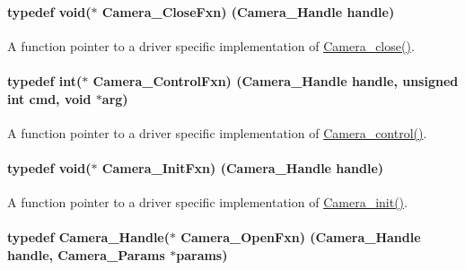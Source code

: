 \paragraph[{Camera\+\_\+\+Close\+Fxn}]{\setlength{\rightskip}{0pt plus 5cm}typedef void($\ast$ Camera\+\_\+\+Close\+Fxn) ({\bf Camera\+\_\+\+Handle} handle)}\label{_camera_8h_ae6f2789af3ea253197fd2ce98db352f4}


A function pointer to a driver specific implementation of \hyperlink{_camera_8h_a132c638e5ea994c1f06124f5762470b4}{Camera\+\_\+close()}. 

\paragraph[{Camera\+\_\+\+Control\+Fxn}]{\setlength{\rightskip}{0pt plus 5cm}typedef int($\ast$ Camera\+\_\+\+Control\+Fxn) ({\bf Camera\+\_\+\+Handle} handle, unsigned int cmd, void $\ast$arg)}\label{_camera_8h_ae81dd59b680fa8d7a3a9f8fc226f593f}


A function pointer to a driver specific implementation of \hyperlink{_camera_8h_adfc7e9a60daa499220296a238a09b393}{Camera\+\_\+control()}. 

\paragraph[{Camera\+\_\+\+Init\+Fxn}]{\setlength{\rightskip}{0pt plus 5cm}typedef void($\ast$ Camera\+\_\+\+Init\+Fxn) ({\bf Camera\+\_\+\+Handle} handle)}\label{_camera_8h_a3b6d043e96bfc1f1443521ef10ea01f3}


A function pointer to a driver specific implementation of \hyperlink{_camera_8h_ab0208c74b70ac5b50cb26c36f1f3ebad}{Camera\+\_\+init()}. 

\paragraph[{Camera\+\_\+\+Open\+Fxn}]{\setlength{\rightskip}{0pt plus 5cm}typedef {\bf Camera\+\_\+\+Handle}($\ast$ Camera\+\_\+\+Open\+Fxn) ({\bf Camera\+\_\+\+Handle} handle, {\bf Camera\+\_\+\+Params} $\ast$params)}\label{_camera_8h_a589bec3690a5b7c7890a0e411a1cad9f}


